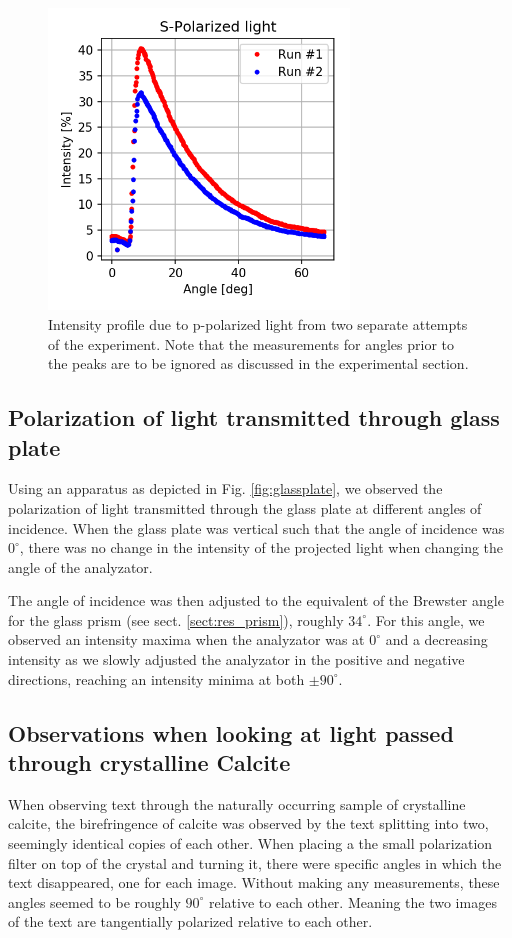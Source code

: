 \documentclass[11pt,a4paper, twocolumn]{article}
\begin{document}
  \begin{figure}[H]
    \center
    \includegraphics[width=8cm]{scripts/spolar.png}
    \caption{Intensity profile due to p-polarized light from two separate attempts of the experiment. Note that the measurements for angles prior to the peaks are to be ignored as discussed in the experimental section.}
    \label{fig:spolar}
  \end{figure}

  \subsection{Polarization of light transmitted through glass plate}
    Using an apparatus as depicted in Fig. \ref{fig:glassplate}, we observed the polarization of light transmitted through the glass plate at different angles of incidence. When the glass plate was vertical such that the angle of incidence was $0^\circ$, there was no change in the intensity of the projected light when changing the angle of the analyzator. 

    The angle of incidence was then adjusted to the equivalent of the Brewster angle for the glass prism (see sect. \ref{sect:res_prism}), roughly $34^\circ$. For this angle, we observed an intensity maxima when the analyzator was at $0^\circ$ and a decreasing intensity as we slowly adjusted the analyzator in the positive and negative directions, reaching an intensity minima at both $\pm 90^\circ$. 

  \subsection{Observations when looking at light passed through crystalline Calcite}
    When observing text through the naturally occurring sample of crystalline calcite, the birefringence of calcite was observed by the text splitting into two, seemingly identical copies of each other. When placing a the small polarization filter on top of the crystal and turning it, there were specific angles in which the text disappeared, one for each image. Without making any measurements, these angles seemed to be roughly $90^\circ$ relative to each other. Meaning the two images of the text are tangentially polarized relative to each other. 
\end{document}
